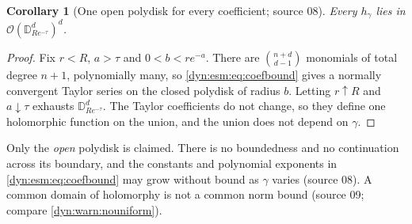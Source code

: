 \documentclass[11pt,letterpaper]{article}
\newtheorem{corollary}[corollary]{Corollary}
\theoremstyle{definition}
\theoremstyle{remark}
\newcommand{\OO}{\mathcal O}
\numberwithin{equation}{section}
\begin{document}
\begin{corollary}[One open polydisk for every coefficient; source 08]
\label{dyn:esm:cor:commondomain}
Every $h_\gamma$ lies in $\OO(\mathbb D^{d}_{Re^{-\tau}})^{d}$.
\end{corollary}
\begin{proof}
Fix $r<R$, $a>\tau$ and $0<b<re^{-a}$. There are $\binom{n+d}{d-1}$
monomials of total degree $n+1$, polynomially many, so
\eqref{dyn:esm:eq:coefbound} gives a normally convergent Taylor series on the
closed polydisk of radius $b$. Letting $r\uparrow R$ and $a\downarrow\tau$
exhausts $\mathbb D^{d}_{Re^{-\tau}}$. The Taylor coefficients do not
change, so they define one holomorphic function on the union, and the union
does not depend on $\gamma$.
\end{proof}

Only the \emph{open} polydisk is claimed. There is no boundedness and no
continuation across its boundary, and the constants and polynomial exponents
in \eqref{dyn:esm:eq:coefbound} may grow without bound as $\gamma$ varies
(source 08). A common domain of holomorphy is not a common norm bound
(source 09; compare \cref{dyn:warn:nouniform}).
\end{document}
